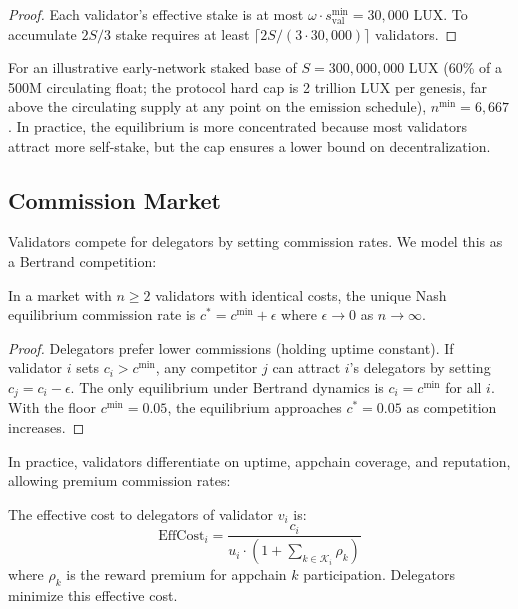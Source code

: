 \begin{proof}
Each validator's effective stake is at most $\omega \cdot s^{\min}_{\text{val}} = 30{,}000$ LUX. To accumulate $2S/3$ stake requires at least $\lceil 2S / (3 \cdot 30{,}000) \rceil$ validators.
\end{proof}

For an illustrative early-network staked base of $S = 300{,}000{,}000$ LUX (60\% of a 500M circulating float; the protocol hard cap is 2 trillion LUX per genesis, far above the circulating supply at any point on the emission schedule), $n^{\min} = 6{,}667$. In practice, the equilibrium is more concentrated because most validators attract more self-stake, but the cap ensures a lower bound on decentralization.

\subsection{Commission Market}

Validators compete for delegators by setting commission rates. We model this as a Bertrand competition:

\begin{theorem}\label{thm:commission}
In a market with $n \geq 2$ validators with identical costs, the unique Nash equilibrium commission rate is $c^* = c^{\min} + \epsilon$ where $\epsilon \to 0$ as $n \to \infty$.
\end{theorem}

\begin{proof}
Delegators prefer lower commissions (holding uptime constant). If validator $i$ sets $c_i > c^{\min}$, any competitor $j$ can attract $i$'s delegators by setting $c_j = c_i - \epsilon$. The only equilibrium under Bertrand dynamics is $c_i = c^{\min}$ for all $i$. With the floor $c^{\min} = 0.05$, the equilibrium approaches $c^* = 0.05$ as competition increases.
\end{proof}

In practice, validators differentiate on uptime, appchain coverage, and reputation, allowing premium commission rates:

\begin{definition}
The effective cost to delegators of validator $v_i$ is:
\begin{equation}
    \text{EffCost}_i = \frac{c_i}{u_i \cdot (1 + \sum_{k \in \mathcal{K}_i} \rho_k)}
\end{equation}
where $\rho_k$ is the reward premium for appchain $k$ participation. Delegators minimize this effective cost.
\end{definition}

